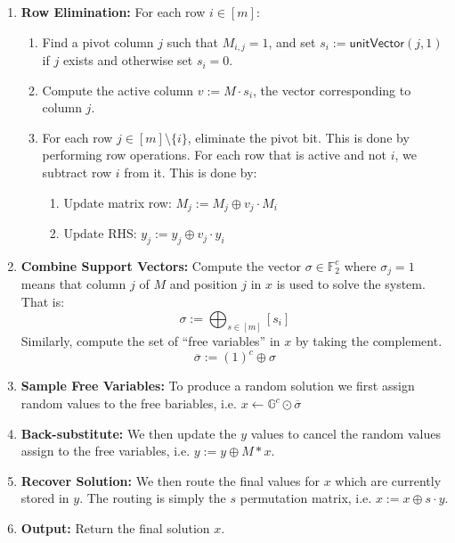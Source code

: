 \begin{enumerate}
    \item \textbf{Row Elimination:} For each row $i \in [m]$:
    \begin{enumerate}
        \item Find a pivot column $j$ such that $M_{i,j} = 1$, and set $s_i := \mathsf{unitVector}(j, 1)$ if $j$ exists and otherwise set $s_i = 0$.
        \item Compute the active column $v := M\cdot  s_i$, the vector corresponding to column $j$.
        \item For each row $j \in [m] \setminus \{i\}$, eliminate the pivot bit. This is done by performing row operations. For each row that is active and not $i$, we subtract row $i$ from it. This is done by:
        \begin{enumerate}
            \item Update matrix row: \(M_j := M_j \oplus v_j \cdot M_i\)
            \item Update RHS: \(y_j := y_j \oplus v_j \cdot y_i\)
        \end{enumerate}
    \end{enumerate}

    \item \textbf{Combine Support Vectors:} Compute the vector $\sigma\in \mathbb{F}^c_2$ where $\sigma_j=1$ means that column $j$ of $M$ and position $j$ in $x$ is used to solve the system. That is:
    \[
    \sigma := \bigoplus_{s \in [m]} [s_i]
    \]
    Similarly, compute the set of ``free variables'' in $x$ by taking the complement.
    \[\overline{\sigma} := (1)^c \oplus \sigma 
    \]
    

    \item \textbf{Sample Free Variables:} To produce a random solution we first assign random values to the free bariables, i.e. $x \leftarrow \mathbb{G}^c \odot \overline{\sigma}$

    \item \textbf{Back-substitute:} We then update the $y$ values to cancel the random values assign to the free variables, i.e. $y := y \oplus M*x$.

    \item \textbf{Recover Solution:} We then route the final values for $x$ which are currently stored in $y$. The routing is simply the $s$ permutation matrix, i.e. $x := x \oplus s \cdot y$.
    \item \textbf{Output:} Return the final solution $x$.
\end{enumerate}


